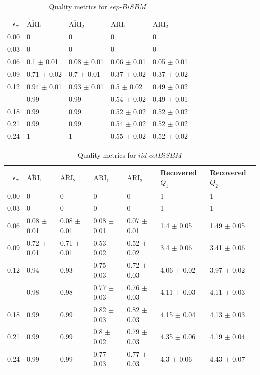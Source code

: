 \tiny
\begin{table}[!h]

\caption{\label{tab:per_model_table}\label{tab:per_model_sep}Quality metrics for $sep\text{-}BiSBM$}
\centering
\begin{tabular}[t]{rllll}
\toprule
$\eps[\alpha]$ & $\overline{\text{ARI}}_{1}$ & $\overline{\text{ARI}}_{2}$ & $\text{ARI}_{1}$ & $\text{ARI}_{2}$\\
\midrule
0.00 & 0 & 0 & 0 & 0\\
0.03 & 0 & 0 & 0 & 0\\
0.06 & 0.1 $\pm$ 0.01 & 0.08 $\pm$ 0.01 & 0.06 $\pm$ 0.01 & 0.05 $\pm$ 0.01\\
0.09 & 0.71 $\pm$ 0.02 & 0.7 $\pm$ 0.01 & 0.37 $\pm$ 0.02 & 0.37 $\pm$ 0.02\\
0.12 & 0.94 $\pm$ 0.01 & 0.93 $\pm$ 0.01 & 0.5 $\pm$ 0.02 & 0.49 $\pm$ 0.02\\
\addlinespace
0.15 & 0.99 & 0.99 & 0.54 $\pm$ 0.02 & 0.49 $\pm$ 0.01\\
0.18 & 0.99 & 0.99 & 0.52 $\pm$ 0.02 & 0.52 $\pm$ 0.02\\
0.21 & 0.99 & 0.99 & 0.54 $\pm$ 0.02 & 0.52 $\pm$ 0.02\\
0.24 & 1 & 1 & 0.55 $\pm$ 0.02 & 0.52 $\pm$ 0.02\\
\bottomrule
\end{tabular}
\end{table}
\begin{table}[!h]

\caption{\label{tab:per_model_table}\label{tab:per_model_iid}Quality metrics for $iid$$\text{-}colBiSBM$}
\centering
\begin{tabular}[t]{rllllll}
\toprule
$\eps[\alpha]$ & $\overline{\text{ARI}}_{1}$ & $\overline{\text{ARI}}_{2}$ & $\text{ARI}_{1}$ & $\text{ARI}_{2}$ & Recovered $Q_1$ & Recovered $Q_2$\\
\midrule
0.00 & 0 & 0 & 0 & 0 & 1 & 1\\
0.03 & 0 & 0 & 0 & 0 & 1 & 1\\
0.06 & 0.08 $\pm$ 0.01 & 0.08 $\pm$ 0.01 & 0.08 $\pm$ 0.01 & 0.07 $\pm$ 0.01 & 1.4 $\pm$ 0.05 & 1.49 $\pm$ 0.05\\
0.09 & 0.72 $\pm$ 0.01 & 0.71 $\pm$ 0.01 & 0.53 $\pm$ 0.02 & 0.52 $\pm$ 0.02 & 3.4 $\pm$ 0.06 & 3.41 $\pm$ 0.06\\
0.12 & 0.94 & 0.93 & 0.75 $\pm$ 0.03 & 0.72 $\pm$ 0.03 & 4.06 $\pm$ 0.02 & 3.97 $\pm$ 0.02\\
\addlinespace
0.15 & 0.98 & 0.98 & 0.77 $\pm$ 0.03 & 0.76 $\pm$ 0.03 & 4.11 $\pm$ 0.03 & 4.11 $\pm$ 0.03\\
0.18 & 0.99 & 0.99 & 0.82 $\pm$ 0.03 & 0.82 $\pm$ 0.03 & 4.15 $\pm$ 0.04 & 4.13 $\pm$ 0.03\\
0.21 & 0.99 & 0.99 & 0.8 $\pm$ 0.02 & 0.79 $\pm$ 0.03 & 4.35 $\pm$ 0.06 & 4.19 $\pm$ 0.04\\
0.24 & 0.99 & 0.99 & 0.77 $\pm$ 0.03 & 0.77 $\pm$ 0.03 & 4.3 $\pm$ 0.06 & 4.43 $\pm$ 0.07\\
\bottomrule
\end{tabular}
\end{table}
